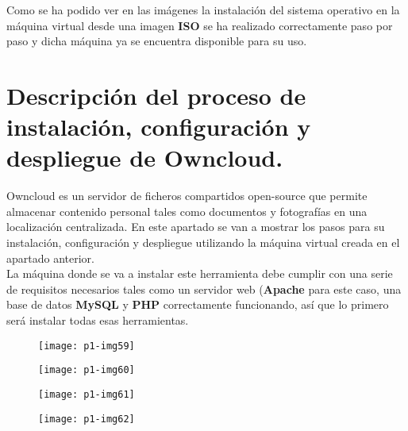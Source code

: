 \documentclass[10pt]{article}
\begin{document}
Como se ha podido ver en las imágenes la instalación del sistema operativo en la máquina virtual desde una imagen \textbf{ISO} se ha realizado correctamente paso por paso y dicha máquina ya se encuentra disponible para su uso. \\


\section{Descripción del proceso de instalación, configuración y despliegue de Owncloud.}
Owncloud es un servidor de ficheros compartidos open-source que permite almacenar contenido personal tales como documentos y fotografías en una localización centralizada. En este apartado se van a mostrar los pasos para su instalación, configuración y despliegue utilizando la máquina virtual creada en el apartado anterior. \\

La máquina donde se va a instalar este herramienta debe cumplir con una serie de requisitos necesarios tales como un servidor web (\textbf{Apache} para este caso, una base de datos \textbf{MySQL} y \textbf{PHP} correctamente funcionando, así que lo primero será instalar todas esas herramientas. \\

\begin{figure}[H]
	\begin{center}
 		\texttt{[image: p1-img59]}
	\end{center} 
\end{figure}

\begin{figure}[H]
	\begin{center}
 		\texttt{[image: p1-img60]}
	\end{center} 
\end{figure}

\begin{figure}[H]
	\begin{center}
 		\texttt{[image: p1-img61]}
	\end{center} 
\end{figure}

\begin{figure}[H]
	\begin{center}
 		\texttt{[image: p1-img62]}
	\end{center} 
\end{figure}
\end{document}
